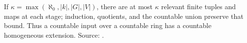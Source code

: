If \(\kappa=\max(\aleph_0,|k|,|G|,|V|)\), there are at
most \(\kappa\) relevant finite tuples and maps at each
stage; induction, quotients, and the countable union
preserve that bound. Thus a countable input over a
countable ring has a countable homogeneous extension.
Source: .

